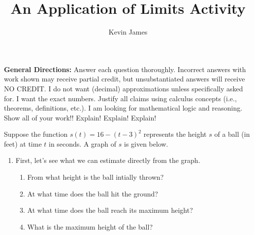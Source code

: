 \documentclass[handout,nooutcomes,noauthor,12pt]{ximera}
\author{Kevin James}
\title{An Application of Limits Activity}
\begin{document}
	\begin{abstract}
		
	\end{abstract}
	\maketitle
	\textbf{General Directions:}  Answer each question thoroughly.  Incorrect answers with work shown may receive partial credit, but unsubstantiated answers will receive NO CREDIT.  I do not want (decimal) approximations unless specifically asked for.  I want the exact numbers.  Justify all claims using calculus concepts (i.e., theorems, definitions, etc.).  I am looking for mathematical logic and reasoning.  Show all of your work!! Explain!  Explain!  Explain!
	
	Suppose the function $ s(t) = 16-(t-3)^2 $ represents the height $ s $ of a ball (in feet) at time $ t $ in seconds.  A graph of $ s $ is given below.
	
	\begin{image}
	\end{image}
	
	 
	\begin{enumerate}[label=\arabic*.]
		\item First, let's see what we can estimate directly from the graph.
		\begin{enumerate}[label=(\alph*)]
			\item From what height is the ball intially thrown?
			\item At what time does the ball hit the ground?
			\item At what time does the ball reach its maximum height?
			\item What is the maximum height of the ball?
		\end{enumerate}
	
		\clearpage
	\end{enumerate}	
	
\end{document}
